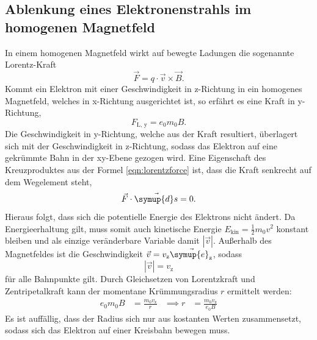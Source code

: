 \subsection{Ablenkung eines Elektronenstrahls im homogenen Magnetfeld}

    In einem homogenen Magnetfeld wirkt auf bewegte Ladungen die sogenannte Lorentz-Kraft 
    \begin{equation} \label{eqn:lorentzforce}
        \vec{F} = q\cdot \vec{v} \times \vec{B}.
    \end{equation}
    Kommt ein Elektron mit einer Geschwindigkeit in z-Richtung in ein homogenes Magnetfeld, welches in x-Richtung ausgerichtet ist, so erfährt es eine Kraft in y-Richtung, 
    \begin{equation*}
        F_{\text{L, y}} = e_0 m_0 B.
    \end{equation*}
    Die Geschwindigkeit in y-Richtung, welche aus der Kraft resultiert, überlagert sich mit der Geschwindigkeit in z-Richtung, sodass das Elektron auf eine gekrümmte Bahn in der 
    xy-Ebene gezogen wird. Eine Eigenschaft des Kreuzproduktes aus der Formel \eqref{eqn:lorentzforce} ist, dass die Kraft senkrecht auf dem Wegelement steht,
    \begin{equation*}
        \vec{F} \cdot \vec{\symup{d}s} = 0.
    \end{equation*}
    Hieraus folgt, dass sich die potentielle Energie des Elektrons nicht ändert. Da Energieerhaltung gilt, muss somit auch kinetische Energie $E_{\text{kin}} = \frac{1}{2} m_0 v^2$
    konstant bleiben und als einzige veränderbare Variable damit $|\vec{v}|$. Außerhalb des Magnetfeldes ist die Geschwindigkeit $\vec{v} = v_{\text{z}} \vec{\symup{e}_{\text{z}}}$, sodass 
    \begin{equation*}
        |\vec{v}| = v_{\text{z}}
    \end{equation*}
    für alle Bahnpunkte gilt. Durch Gleichsetzen von Lorentzkraft und Zentripetalkraft kann der momentane Krümmungsradius $r$ ermittelt werden:
    \begin{align} \label{eqn:r}
        e_0 m_0 B &= \frac{m_0 v_{\text{z}}}{r} &\implies r &= \frac{m_0 v_{\text{z}}}{e_0 B}
    \end{align}
    Es ist auffällig, dass der Radius sich nur aus kostanten Werten zusammensetzt, sodass sich das Elektron auf einer Kreisbahn bewegen muss. \\

